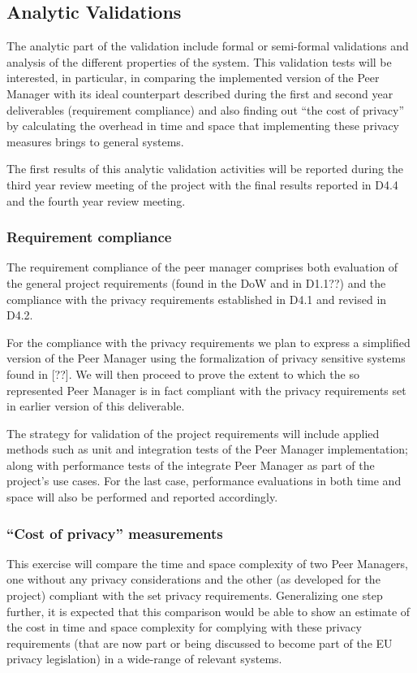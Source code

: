\subsection{Analytic Validations}
The analytic part of the validation include formal or semi-formal validations and analysis of the different properties of the system. This validation tests will be interested, in particular, in comparing the implemented version of the Peer Manager with its ideal counterpart described during the first and second year deliverables (requirement compliance) and also finding out ``the cost of privacy'' by calculating the overhead in time and space that implementing these privacy measures brings to general systems.

The first results of this analytic validation activities will be reported during the third year review meeting of the project with the final results reported in D4.4 and the fourth year review meeting.

\subsubsection{Requirement compliance}
The requirement compliance of the peer manager comprises both evaluation of the general project requirements (found in the DoW and in D1.1??) and the compliance with the privacy requirements established in D4.1 and revised in D4.2.

For the compliance with the privacy requirements we plan to express a simplified version of the Peer Manager using the formalization of privacy sensitive systems found in [??]. We will then proceed to prove the extent to which the so represented Peer Manager is in fact compliant with the privacy requirements set in earlier version of this deliverable. 

The strategy for validation of the project requirements will include applied methods such as unit and integration tests of the Peer Manager implementation; along with performance tests of the integrate Peer Manager as part of the project's use cases. For the last case, performance evaluations in both time and space will also be performed and reported accordingly.  

\subsubsection{``Cost of privacy'' measurements}
This exercise will compare the time and space complexity of two Peer Managers, one without any privacy considerations and the other (as developed for the project) compliant with the set privacy requirements. Generalizing one step further, it is expected that this comparison would be able to show an estimate of the cost in time and space complexity for complying with these privacy requirements (that are now part or being discussed to become part of the EU privacy legislation) in a wide-range of relevant systems.

